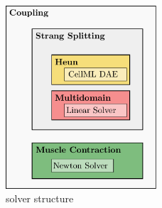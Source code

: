 \begin{figure}
  \centering%
  \includegraphics[width=0.5\textwidth]{images/implementation/solver_structure_contraction.pdf}%
  \caption{solver structure}%
  \label{fig:prestrech1b}%
\end{figure}%


